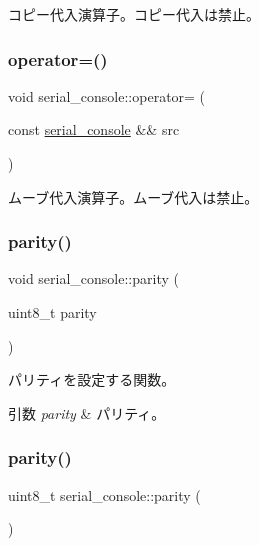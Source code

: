 コピー代入演算子。コピー代入は禁止。 \hypertarget{classserial__console_acc5cf17db660a0ff98f3e96f6ef23ca1}{}\label{classserial__console_acc5cf17db660a0ff98f3e96f6ef23ca1} 
\subsubsection{\texorpdfstring{operator=()}{operator=()}\hspace{0.1cm}{\footnotesize\ttfamily [2/2]}}
{\footnotesize\ttfamily void serial\+\_\+console\+::operator= (\begin{DoxyParamCaption}\item[{const \hyperlink{classserial__console}{serial\+\_\+console} \&\&}]{src }\end{DoxyParamCaption})\hspace{0.3cm}{\ttfamily [delete]}}

ムーブ代入演算子。ムーブ代入は禁止。 \hypertarget{classserial__console_a8a6f476df2b731175674a571af2ad1bd}{}\label{classserial__console_a8a6f476df2b731175674a571af2ad1bd} 
\subsubsection{\texorpdfstring{parity()}{parity()}\hspace{0.1cm}{\footnotesize\ttfamily [1/2]}}
{\footnotesize\ttfamily void serial\+\_\+console\+::parity (\begin{DoxyParamCaption}\item[{uint8\+\_\+t}]{parity }\end{DoxyParamCaption})}

パリティを設定する関数。 
\begin{DoxyParams}{引数}
{\em parity} & パリティ。 \\
\hline
\end{DoxyParams}
\hypertarget{classserial__console_ad98e06cb51a6b41fbc4ee5e3b6cfd309}{}\label{classserial__console_ad98e06cb51a6b41fbc4ee5e3b6cfd309} 
\subsubsection{\texorpdfstring{parity()}{parity()}\hspace{0.1cm}{\footnotesize\ttfamily [2/2]}}
{\footnotesize\ttfamily uint8\+\_\+t serial\+\_\+console\+::parity (\begin{DoxyParamCaption}{ }\end{DoxyParamCaption})}


